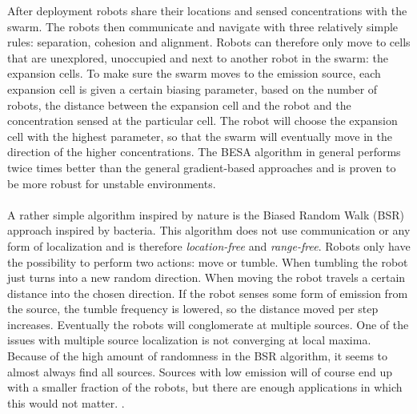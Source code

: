 		After deployment robots share their locations and sensed concentrations with the swarm.
		The robots then communicate and navigate with three relatively simple rules: separation, cohesion and alignment.
		Robots can therefore only move to cells that are unexplored, unoccupied and next to another robot in the swarm: the expansion cells.
		To make sure the swarm moves to the emission source, each expansion cell is given a certain biasing parameter, based on the number of robots, the distance between the expansion cell and the robot and the concentration sensed at the particular cell.
		The robot will choose the expansion cell with the highest parameter, so that the swarm will eventually move in the direction of the higher concentrations.
		The BESA algorithm in general performs twice times better than the general gradient-based approaches and is proven to be more robust for unstable environments. \cite{cui2004swarm}
		\\ \\
		A rather simple algorithm inspired by nature is the Biased Random Walk (BSR) approach inspired by bacteria.
		This algorithm does not use communication or any form of localization and is therefore \emph{location-free} and \emph{range-free}.
		Robots only have the possibility to perform two actions: move or tumble. 
		When tumbling the robot just turns into a new random direction. 
		When moving the robot travels a certain distance into the chosen direction. 
		If the robot senses some form of emission from the source, the tumble frequency is lowered, so the distance moved per step increases.
		Eventually the robots will conglomerate at multiple sources.
		One of the issues with multiple source localization is not converging at local maxima.
		Because of the high amount of randomness in the BSR algorithm, it seems to almost always find all sources. Sources with low emission will of course end up with a smaller fraction of the robots, but there are enough applications in which this would not matter. \cite{dhariwal2004bacterium}.

